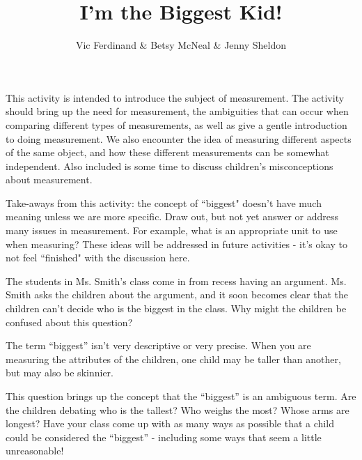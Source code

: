 \documentclass[]{ximera}
\title{I'm the Biggest Kid!}
\author{Vic Ferdinand \& Betsy McNeal \& Jenny Sheldon}
\begin{document}
\begin{abstract}\end{abstract}
\maketitle

\begin{instructorIntro}

This activity is intended to introduce the subject of measurement.  The activity should bring up the need for measurement, the ambiguities that can occur when comparing different types of measurements, as well as give a gentle introduction to doing measurement.  We also encounter the idea of measuring different aspects of the same object, and how these different measurements can be somewhat independent.  Also included is some time to discuss children's misconceptions about measurement.

Take-aways from this activity: the concept of ``biggest" doesn't have much meaning unless we are more specific.  Draw out, but not yet answer or address many issues in measurement.  For example, what is an appropriate unit to use when measuring?  These ideas will be addressed in future activities - it's okay to not feel ``finished" with the discussion here.


\end{instructorIntro}

\begin{problem}
    The students in Ms. Smith's class come in from recess having an argument.  Ms. Smith asks the children about the argument, and it soon becomes clear that the children can't decide who is the biggest in the class.  Why might the children be confused about this question?
    
    \begin{solution}
    The term ``biggest'' isn't very descriptive or very precise.  When you are measuring the attributes of the children, one child may be taller than another, but may also be skinnier.
    \end{solution}
    
    \begin{instructorNotes}
        This question brings up the concept that the ``biggest'' is an ambiguous term.  Are the children debating who is the tallest?  Who weighs the most?  Whose arms are longest?  Have your class come up with as many ways as possible that a child could be considered the ``biggest'' - including some ways that seem a little unreasonable!
    \end{instructorNotes}
\end{problem}
\end{document}
